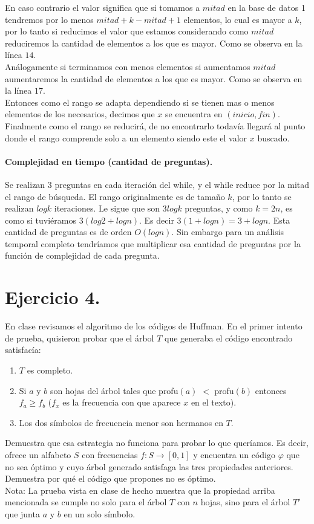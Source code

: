 \documentclass[12pt]{article}
\begin{document}
En caso contrario el valor significa que si tomamos a $mitad$ en la base de datos 1 tendremos por lo menos $mitad +k-mitad + 1$ elementos, lo cual es mayor a $k$, por lo tanto si reducimos el valor que estamos considerando como $mitad$ reduciremos la cantidad de elementos a los que es mayor. Como se observa en la línea $14$.\\
Análogamente si terminamos con menos elementos si aumentamos $mitad$ aumentaremos la cantidad de elementos a los que es mayor. Como se observa en la línea $17$.\\
Entonces como el rango se adapta dependiendo si se tienen mas o menos elementos de los necesarios, decimos que $x$ se encuentra en $(inicio,fin)$.\\
Finalmente como el rango se reducirá, de no encontrarlo todavía llegará al punto donde el rango comprende solo a un elemento siendo este el valor $x$ buscado.\\
\paragraph{Complejidad en tiempo (cantidad de preguntas).} Se realizan 3 preguntas en cada iteración del while, y el while reduce por la mitad el rango de búsqueda. El rango originalmente es de tamaño $k$, por lo tanto se realizan $logk$ iteraciones. Le sigue que son $3logk$ preguntas, y como $k=2n$, es como si tuviéramos $3(log2 + logn)$. Es decir $3(1 + logn)=3 + logn$.  Esta cantidad de preguntas es de orden $O(logn)$. Sin embargo para un análisis temporal completo tendríamos que multiplicar esa cantidad de preguntas por la función de complejidad de cada pregunta.
\pagebreak
\section{Ejercicio 4.}
En clase revisamos el algoritmo de los códigos de Huffman. En el primer intento de prueba, quisieron probar que el árbol $T$ que generaba el código encontrado satisfacía:
\begin{enumerate}
	\item  $T$ es completo.
	\item Si $a$ y $b$ son hojas del árbol tales que profu$(a)$ $<$ profu$(b)$ entonces $f_a \geq f_b$ ($f_x$ es la frecuencia con que aparece $x$ en el texto).
	\item Los dos símbolos de frecuencia menor son hermanos en $T$.
\end{enumerate}
Demuestra que esa estrategia no funciona para probar lo que queríamos. Es decir, ofrece un alfabeto $S$ con frecuencias $f:S\rightarrow[0,1]$ y encuentra un código $\varphi$ que no sea óptimo y cuyo árbol generado satisfaga las tres propiedades anteriores. Demuestra por qué el código que propones no es óptimo.\\
Nota: La prueba vista en clase de hecho muestra que la propiedad arriba mencionada se cumple no solo para el árbol $T$ con $n$ hojas, sino para el árbol $T'$ que junta $a$ y $b$ en un solo símbolo. 
\end{document}
